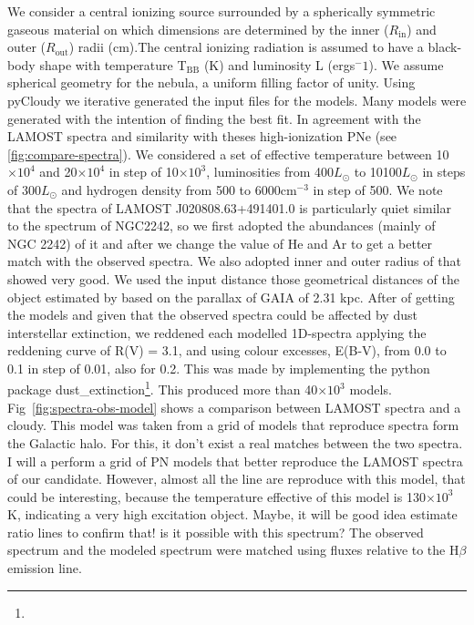 \documentclass[fleqn,usenatbib]{mnras}
\begin{document}
{We consider a central ionizing source surrounded by a spherically symmetric
gaseous material on which dimensions are determined by the inner ($R_{\mathrm{in}}$) and
outer ($R_{\mathrm{out}}$) radii (cm).The central ionizing radiation is assumed to have a
black-body shape with temperature T$_{\mathrm{BB}}$ (K) and luminosity L
(ergs$^-1$). We assume spherical geometry for the nebula, a uniform filling factor of unity.
Using {\sc pyCloudy} we iterative generated the input files for the models.
Many models were generated with the intention of finding the best fit.
In agreement with the LAMOST spectra and similarity with theses high-ionization PNe
(see \ref{fig:compare-spectra}).
We considered a set of effective temperature between 10$\times10^4$ and 20$\times10^4$
in step of 10$\times10^3$, luminosities from 400$L_{\odot}$ to 10100$L_{\odot}$ in steps
of 300$L_{\odot}$ and hydrogen density from 500 to  6000cm$^{-3}$ in step of 500.
We note that the spectra of LAMOST J020808.63+491401.0 is particularly quiet similar to the
spectrum of NGC2242, so we first adopted the abundances (mainly of NGC 2242) of it and after we change
the value of He and Ar to get a better match with the observed spectra. We also adopted inner
and outer radius of that showed very good. We used the input distance those geometrical distances of
the object estimated by \citet{Bailer:2021} based on
the parallax of GAIA of 2.31 kpc.
After of getting the models and given that the observed spectra could be affected by dust interstellar extinction, we reddened each modelled 1D-spectra applying the
reddening curve of R(V) = 3.1, and using
colour excesses, E(B-V), from 0.0 to 0.1 in step of 0.01, also for 0.2.
This was made by implementing the python package {\sc dust_extinction}\footnote{}. This produced more than 40$\times10^3$ models.
Fig~\ref{fig:spectra-obs-model} shows a comparison
between LAMOST spectra and a {\sc cloudy}. This model was taken from a grid of
models that reproduce spectra form the Galactic halo. For this, it don't exist a real matches between the two spectra.
I will a perform a grid of PN models that better reproduce the LAMOST spectra of our candidate.
However, almost all the line are reproduce with this model, that could be interesting, because the
temperature effective of this model is 130$\times10^3$K, indicating a very high excitation object.
Maybe, it will be good idea estimate ratio lines to confirm that! is it possible with this spectrum?
The observed spectrum and the modeled spectrum were matched using fluxes relative to the H{$\beta$}
emission line.

}
\end{document}
